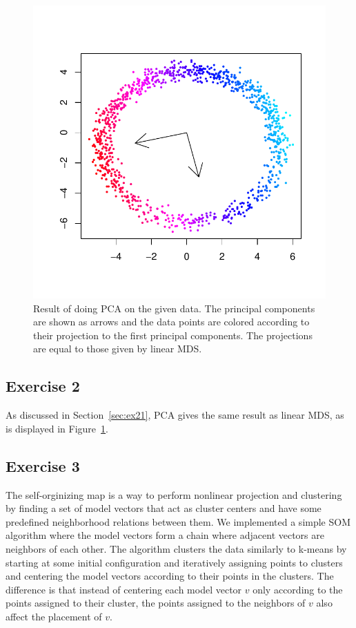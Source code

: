 \documentclass{article}
\begin{document}
\begin{figure}
\begin{minipage}{0.4\columnwidth}
	\includegraphics[scale=0.6]{mdspca}
	\caption{Result of doing PCA on the given data. The principal components are shown as arrows and the data points are colored according to their projection to the first principal components. The projections are equal to those given by linear MDS.}\label{fig:mdspca}
\end{minipage}\end{figure}

\subsection{Exercise 2}
As discussed in Section~\ref{sec:ex21}, PCA gives the same result as linear MDS, as is displayed in Figure~\ref{fig:mdspca}.

\subsection{Exercise 3}
The self-orginizing map is a way to perform nonlinear projection and clustering by finding a set of model vectors that act as cluster centers and have some predefined neighborhood relations between them.
We implemented a simple SOM algorithm where the model vectors form a chain where adjacent vectors are neighbors of each other.
The algorithm clusters the data similarly to k-means by starting at some initial configuration and iteratively assigning points to clusters and centering the model vectors according to their points in the clusters.
The difference is that instead of centering each model vector $v$ only according to the points assigned to their cluster, the points assigned to the neighbors of $v$ also affect the placement of $v$.
\end{document}
